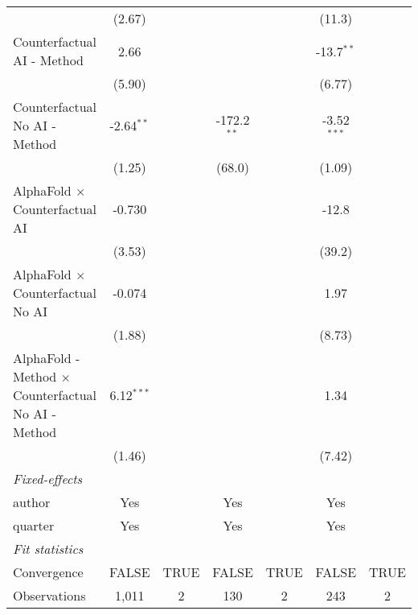 \begin{tabular}{lcccccc}
                                                              & (2.67)        &      &               &      & (11.3)        &   \\   
   Counterfactual AI - Method                                 & 2.66          &      &               &      & -13.7$^{**}$  &   \\   
                                                              & (5.90)        &      &               &      & (6.77)        &   \\   
   Counterfactual No AI - Method                              & -2.64$^{**}$  &      & -172.2$^{**}$ &      & -3.52$^{***}$ &   \\   
                                                              & (1.25)        &      & (68.0)        &      & (1.09)        &   \\   
   AlphaFold $\times$ Counterfactual AI                       & -0.730        &      &               &      & -12.8         &   \\   
                                                              & (3.53)        &      &               &      & (39.2)        &   \\   
   AlphaFold $\times$ Counterfactual No AI                    & -0.074        &      &               &      & 1.97          &   \\   
                                                              & (1.88)        &      &               &      & (8.73)        &   \\   
   AlphaFold - Method $\times$ Counterfactual No AI - Method  & 6.12$^{***}$  &      &               &      & 1.34          &   \\   
                                                              & (1.46)        &      &               &      & (7.42)        &   \\   
   \midrule
   \emph{Fixed-effects}\\
   author                                                     & Yes           &      & Yes           &      & Yes           & \\  
   quarter                                                    & Yes           &      & Yes           &      & Yes           & \\  
   \midrule
   \emph{Fit statistics}\\
   Convergence                                                &FALSE          & TRUE & FALSE         & TRUE & FALSE         & TRUE\\  
   Observations                                               & 1,011         & 2    & 130           & 2    & 243           & 2\\  

\end{tabular}

